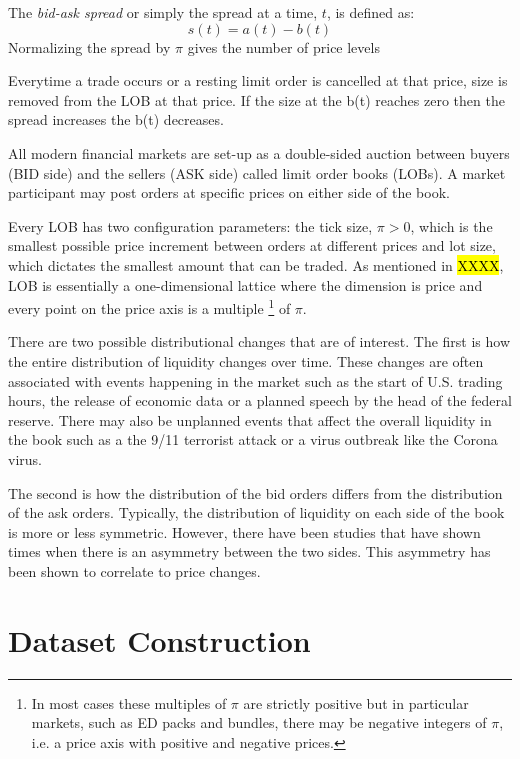 The \textit{bid-ask spread} or simply the spread at a time, $t$, is defined as:
\begin{equation}
s(t) = a(t) - b(t)
\end{equation}
Normalizing the spread by $\pi$ gives the number of price levels

Everytime a trade occurs or a resting limit order is cancelled at that price, size is removed from the LOB at that price. If the size at the b(t) reaches zero then the spread increases the b(t) decreases. 

All modern financial markets are set-up as a double-sided auction between buyers (BID side) and the sellers (ASK side) called limit order books (LOBs). A market participant may post orders at specific prices on either side of the book.  

Every LOB has two configuration parameters: the tick size, $\pi >0$, which is the smallest possible price increment between orders at different prices and lot size, which dictates the smallest amount that can be traded. As mentioned in \hl{XXXX}, LOB is essentially a one-dimensional lattice where the dimension is price and every point on the price axis is a multiple \footnote{In most cases these multiples of $\pi$ are strictly positive but in particular markets, such as ED packs and bundles, there may be negative integers of $\pi$, i.e. a price axis with positive and negative prices.} of $\pi$.

There are two possible distributional changes that are of interest. The first is how the entire distribution of liquidity changes over time. These changes are often associated with events happening in the market such as the start of U.S. trading hours, the release of economic data or a planned speech by the head of the federal reserve. There may also be unplanned events that affect the overall liquidity in the book such as a the 9/11 terrorist attack or a virus outbreak like the Corona virus.

The second is how the distribution of the bid orders differs from the distribution of the ask orders. Typically, the distribution of liquidity on each side of the book is more or less symmetric. However, there have been studies that have shown times when there is an asymmetry between the two sides. This asymmetry has been shown to correlate to price changes. 



\section{Dataset Construction}

